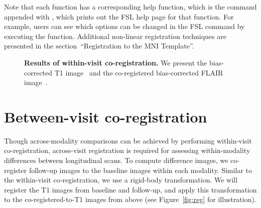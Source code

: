 Note that each  function has a corresponding help function, which is the  command appended with , which prints out the FSL help page for that function.  For example, users can see which options can be changed in the FSL  command by executing the  function.   Additional non-linear registration techniques are presented in the section~``Registration to the MNI Template''.  









\begin{figure}
\hfill
\caption[{\bf Results of within-visit co-registration.}]{{\bf Results of within-visit co-registration.}  We present the bias-corrected T1 image~\protect{} and the co-registered bias-corrected FLAIR image~\protect{}.  }
\label{fig:coreg}
\end{figure}


\section{Between-visit co-registration}
Though across-modality comparisons can be achieved by performing within-visit co-registration, across-visit registration is required for assessing within-modality differences between longitudinal scans.   To compute difference images, we co-register follow-up images to the baseline images within each modality.  Similar to the within-visit co-registration, we use a rigid-body transformation.  We will register the T1 images from baseline and follow-up, and apply this transformation to the co-registered-to-T1 images from above (see Figure~\ref{fig:reg} for illustration).  

